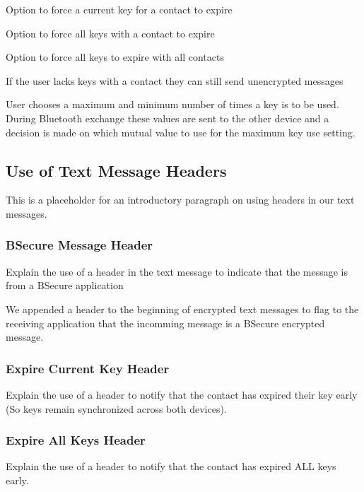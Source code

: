 Option to force a current key for a contact to expire

Option to force all keys with a contact to expire

Option to force all keys to expire with all contacts

If the user lacks keys with a contact they can still send unencrypted messages

User chooses a maximum and minimum number of times a key is to be used. During Bluetooth exchange
these values are sent to the other device and a decision is made on which mutual value to use for the maximum key use setting.

\subsection{Use of Text Message Headers}
This is a placeholder for an introductory paragraph on using headers in our text messages.

\subsubsection{BSecure Message Header}
Explain the use of a header in the text message to indicate that the message is from a BSecure application

We appended a header to the beginning of encrypted text messages to flag to the receiving application that
the incomming message is a BSecure encrypted message.

\subsubsection{Expire Current Key Header}
Explain the use of a header to notify that the contact has expired their key early (So keys remain synchronized across both devices).

\subsubsection{Expire All Keys Header}
Explain the use of a header to notify that the contact has expired ALL keys early.


